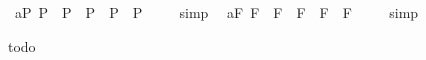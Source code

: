\begin{isabellebody}
\endisadelimproof
\isanewline
{}\isamarkupfalse%
\ a{}{}{\isacharunderscore}{}{\isacharunderscore}P{\isacharcolon}\ {\isachardoublequoteopen}{\isacharbrackleft}{\isacharparenleft}\isactrlbold {\isasymnot}{\isacharparenleft}{\isasymphi}\isactrlsup P{\isacharparenright}\ \isactrlbold {\isasymrightarrow}\ \isactrlbold {\isasymnot}{\isacharparenleft}{\isasympsi}\isactrlsup P{\isacharparenright}{\isacharparenright}\ \isactrlbold {\isasymrightarrow}\ {\isacharparenleft}{\isacharparenleft}\isactrlbold {\isasymnot}{\isacharparenleft}{\isasymphi}\isactrlsup P{\isacharparenright}\ \isactrlbold {\isasymrightarrow}\ {\isacharparenleft}{\isasympsi}\isactrlsup P{\isacharparenright}{\isacharparenright}\ \isactrlbold {\isasymrightarrow}\ {\isacharparenleft}{\isasymphi}\isactrlsup P{\isacharparenright}{\isacharparenright}{\isacharbrackright}\ {\isacharequal}\ {\isasymtop}{\isachardoublequoteclose}%
\isadelimproof
\ %
\endisadelimproof
%
\isatagproof
{}\isamarkupfalse%
\ simp\ \isamarkupfalse%
%
\endisatagproof
{\isafoldproof}%
%
\isadelimproof
%
\endisadelimproof
\isanewline
{}\isamarkupfalse%
\ a{}{}{\isacharunderscore}{}{\isacharunderscore}F{\isacharcolon}\ {\isachardoublequoteopen}{\isacharbrackleft}{\isacharparenleft}\isactrlbold {\isasymnot}{\isacharparenleft}{\isasymphi}\isactrlsup F{\isacharparenright}\ \isactrlbold {\isasymrightarrow}\ \isactrlbold {\isasymnot}{\isacharparenleft}{\isasympsi}\isactrlsup F{\isacharparenright}{\isacharparenright}\ \isactrlbold {\isasymrightarrow}\ {\isacharparenleft}{\isacharparenleft}\isactrlbold {\isasymnot}{\isacharparenleft}{\isasymphi}\isactrlsup F{\isacharparenright}\ \isactrlbold {\isasymrightarrow}\ {\isacharparenleft}{\isasympsi}\isactrlsup F{\isacharparenright}{\isacharparenright}\ \isactrlbold {\isasymrightarrow}\ {\isacharparenleft}{\isasymphi}\isactrlsup F{\isacharparenright}{\isacharparenright}{\isacharbrackright}\ {\isacharequal}\ {\isasymtop}{\isachardoublequoteclose}%
\isadelimproof
\ %
\endisadelimproof
%
\isatagproof
{}\isamarkupfalse%
\ simp\ \isamarkupfalse%
%
\endisatagproof
{\isafoldproof}%
%
\isadelimproof
%
\endisadelimproof
%
\isamarkuptrue%
%
\begin{isamarkuptext}%
todo%
\end{isamarkuptext}%
\isamarkuptrue%
%
\isamarkuptrue%
%
\begin{isamarkuptext}%

\end{isamarkuptext}
\end{isabellebody}
